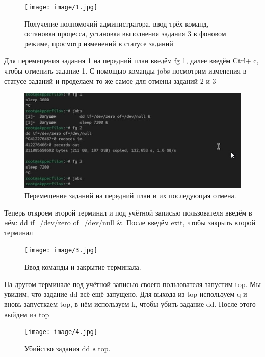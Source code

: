 \documentclass[
  english,
  russian,
  12pt,
  a4paper,
  DIV=11,
  numbers=noendperiod]{scrreprt}
\begin{document}
\begin{figure}

{\centering \texttt{[image: image/1.jpg]}

}

\caption{Получение полномочий администратора, ввод трёх команд,
остановка процесса, установка выполнения задания 3 в фоновом режиме,
просмотр изменений в статусе заданий}

\end{figure}%

Для перемещения задания 1 на передний план введём fg 1, далее введём
Ctrl+ c, чтобы отменить задание 1. С помощью команды jobs посмотрим
изменения в статусе заданий и проделаем то же самое для отмены заданий 2
и 3

\begin{figure}

{\centering \includegraphics[width=0.7\linewidth,height=\textheight,keepaspectratio]{image/2(1).jpg}

}

\caption{Перемещение заданий на передний план и их последующая отмена.}

\end{figure}%

Теперь откроем второй терминал и под учётной записью пользователя введём
в нём: dd if=/dev/zero of=/dev/null \&. После введём exit, чтобы закрыть
второй терминал

\begin{figure}

{\centering \texttt{[image: image/3.jpg]}

}

\caption{Ввод команды и закрытие терминала.}

\end{figure}%

На другом терминале под учётной записью своего пользователя запустим
top. Мы увидим, что задание dd всё ещё запущено. Для выхода из top
используем q и вновь запусткаем top, в нём используем k, чтобы убить
задание dd. После этого выйдем из top

\begin{figure}

{\centering \texttt{[image: image/4.jpg]}

}

\caption{Убийство задания dd в top.}

\end{figure}%
\end{document}
